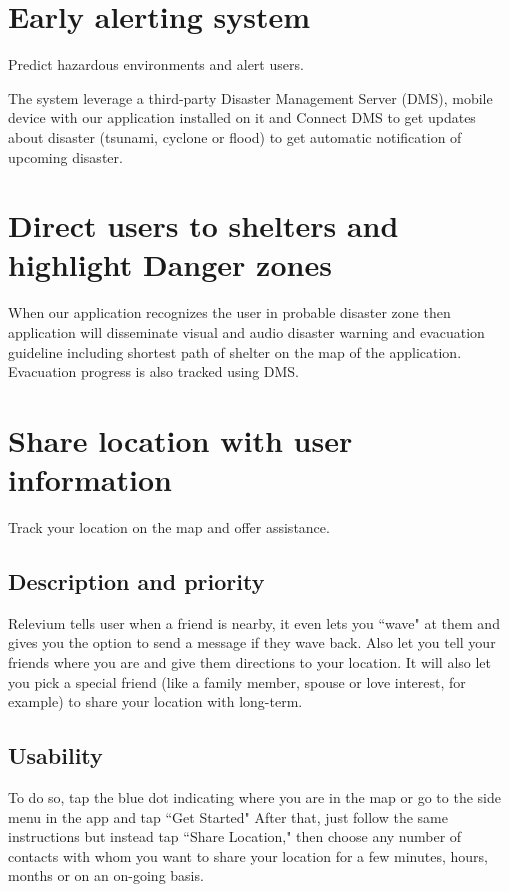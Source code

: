 \documentclass{scrreprt}
\begin{document}
\newpage
\section{Early alerting system}
Predict hazardous environments and alert users.

The system leverage a third-party Disaster Management Server (DMS), mobile device with our application installed on it and Connect DMS to get updates about disaster (tsunami, cyclone or flood) to get automatic notification of upcoming disaster.


\section{Direct users to shelters and highlight Danger zones}


When our application recognizes the user in probable disaster zone then application will disseminate visual and audio disaster warning and evacuation guideline including shortest path of shelter on the map of the application. Evacuation progress is also tracked using DMS.



\section{Share location with user information}
Track your location on the map and offer assistance.


\subsection{Description and priority}
Relevium tells user when a friend is nearby, it even lets you ``wave" at them and gives you the option to send a message if they wave back. Also let you tell your friends where you are and give them directions to your location. It will also let you pick a special friend (like a family member, spouse or love interest, for example) to share your location with long-term.

\subsection{Usability}

To do so, tap the blue dot indicating where you are in the map or go to the side menu in the app and tap ``Get Started" After that, just follow the same instructions but instead tap ``Share Location," then choose any number of contacts with whom you want to share your location for a few minutes, hours, months or on an on-going basis.
\end{document}
